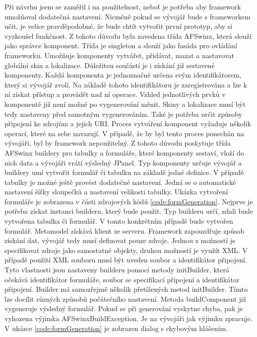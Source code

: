 Při návrhu jsem se zaměřil i na použitelnost, neboť je potřeba aby framework umožňoval dodatečná nastavení. Nicméně pokud se vývojář bude s frameworkem učit, je velice pravděpodobné, že bude chtít vytvořit první prototyp, aby si vyzkoušel funkčnost. Z tohoto důvodu byla zavedena třída AFSwinx, která slouží jako správce komponent. Třída je singleton \cite{gamma} a slouží jako fasáda \cite{gamma}pro ovládání frameworku.  Umožňuje komponenty vytvářet, přidávat, mazat a nastavovat globální skin a lokalizace. Důležitou součástí je i získání již sestavené komponenty. Každá komponenta je jednoznačně určena svým identifikátorem, který si vývojář zvolí. Na základě tohoto identifikátoru je zaregistrována a lze k ní získat přístup a provádět nad ní operace. Vzhled jednotlivých prvků v komponentě již není možné po vygenerování měnit. Skiny a lokalizace musí být tedy nastaveny před samotným vygenerováním. Také je potřeba určit způsoby připojení ke zdrojům a jejich URI. Proces vytváření komponent vyžaduje několik operací, které na sebe navazují. V případě, že by byl tento proces ponechán na vývojáři, byl by framework nepoužitelný. Z tohoto důvodu poskytuje třída AFSwinx buildery \cite{gamma} pro tabulky a formuláře, které komponenty sestaví, vloží do nich data a vývojáři vrátí výsledný JPanel. Typ komponenty určuje vývojář a buildery umí vytvořit formulář či tabulku na základě jedné definice. V případě tabulky je možné ještě provést dodatečné nastavení. Jedná se o automatické nastavení šířky sloupečků a nastavení velikosti tabulky. Ukázka vytvoření formuláře je zobrazena v části zdrojových kódů \ref{code:formGeneration}. Nejprve je potřeba získat instanci builderu, který bude použit. Typ builderu určí, zdali bude vytvořena tabulka či formulář. V tomto konkrétním případě bude vytvořen formulář. Metamodel získává klient ze serveru. Framework zapouzdřuje způsob získání dat, vývojář tedy musí definovat pouze zdroje. Jednou z možností je specifikovat zdroje jako samostatné objekty, druhou možností je využít XML. V případě použití XML souboru musí být uveden soubor a identifikátor připojení. Tyto vlastnosti jsou nastaveny builderu pomocí metody initBuilder, která očekává identifikátor formuláře, soubor se specifikací připojení a identifikátor připojení. Builder má samozřejmě několik přetížených metod initBuilder. Tímto lze docílit různých způsobů počátečního nastavení. Metoda buildComponent již vygeneruje výsledný formulář. Pokud se při generování vyskytne chyba, pak je vyhozena výjimka AFSwinxBuildException. Je na vývojáři jak výjimku zpracuje. V ukázce \ref{code:formGeneration} je zobrazen dialog s chybovým hlášením.

